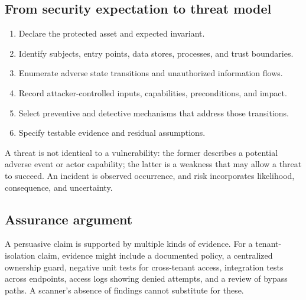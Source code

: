 \documentclass[
  letterpaper,
]{article}
\providecommand{\tightlist}{%
  \setlength{\itemsep}{0pt}\setlength{\parskip}{0pt}}
\begin{document}
\subsection{From security expectation to threat
model}\label{from-security-expectation-to-threat-model}

\begin{enumerate}
\def\labelenumi{\arabic{enumi}.}
\tightlist
\item
  Declare the protected asset and expected invariant.
\item
  Identify subjects, entry points, data stores, processes, and trust
  boundaries.
\item
  Enumerate adverse state transitions and unauthorized information
  flows.
\item
  Record attacker-controlled inputs, capabilities, preconditions, and
  impact.
\item
  Select preventive and detective mechanisms that address those
  transitions.
\item
  Specify testable evidence and residual assumptions.
\end{enumerate}

A threat is not identical to a vulnerability: the former describes a
potential adverse event or actor capability; the latter is a weakness
that may allow a threat to succeed. An incident is observed occurrence,
and risk incorporates likelihood, consequence, and uncertainty.

\subsection{Assurance argument}\label{assurance-argument}

A persuasive claim is supported by multiple kinds of evidence. For a
tenant-isolation claim, evidence might include a documented policy, a
centralized ownership guard, negative unit tests for cross-tenant
access, integration tests across endpoints, access logs showing denied
attempts, and a review of bypass paths. A scanner's absence of findings
cannot substitute for these.
\end{document}
